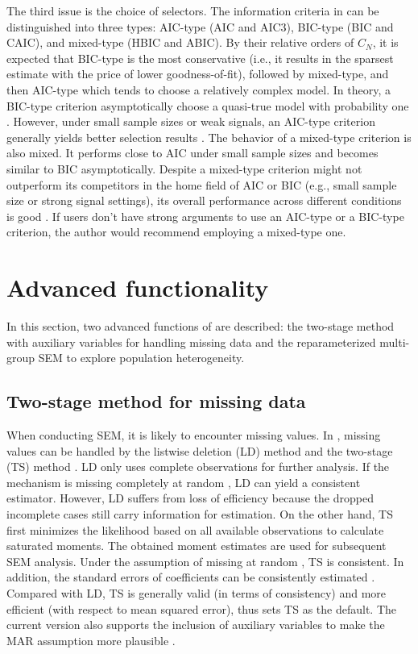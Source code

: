 \documentclass[nojss]{jss}
\begin{document}
The third issue is the choice of selectors. The information criteria in  can be distinguished into three types: AIC-type (AIC and AIC3), BIC-type (BIC and CAIC), and mixed-type (HBIC and ABIC). By their relative orders of $C_N$, it is expected that BIC-type is the most conservative (i.e., it results in the sparsest estimate with the price of lower goodness-of-fit), followed by mixed-type, and then AIC-type which tends to choose a relatively complex model. In theory, a BIC-type criterion asymptotically choose a quasi-true model with probability one \citep[e.g.,][]{Huang2017}. However, under small sample sizes or weak signals, an AIC-type criterion generally yields better selection results \citep[e.g.,][]{Vrieze2012}. The behavior of a mixed-type criterion is also mixed. It performs close to AIC under small sample sizes and becomes similar to BIC asymptotically. Despite a mixed-type criterion might not outperform its competitors in the home field of AIC or BIC (e.g., small sample size or strong signal settings), its overall performance across different conditions is good \citep[e.g.,][]{Lin2017}. If users don't have strong arguments to use an AIC-type or a BIC-type criterion, the author would recommend employing a mixed-type one.



\section{Advanced functionality} \label{sec:adv}
In this section, two advanced functions of  are described: the two-stage method with auxiliary variables for handling missing data and the reparameterized multi-group SEM to explore population heterogeneity.


\subsection{Two-stage method for missing data} \label{sec:adv_miss}
When conducting SEM, it is likely to encounter missing values. In , missing values can be handled by the listwise deletion (LD) method and the two-stage (TS) method \citep{Yuan2000}. LD only uses complete observations for further analysis. If the mechanism is missing completely at random \citep[MCAR;][]{Rubin1976}, LD can yield a consistent estimator. However, LD suffers from loss of efficiency because the dropped incomplete cases still carry information for estimation. On the other hand, TS first minimizes the likelihood based on all available observations to calculate saturated moments. The obtained moment estimates are used for subsequent SEM analysis. Under the assumption of missing at random \citep[MAR;][]{Rubin1976}, TS is consistent. In addition, the standard errors of coefficients can be consistently estimated \citep[e.g.,][]{Yuan2008}. Compared with LD, TS is generally valid (in terms of consistency) and more efficient (with respect to mean squared error), thus  sets TS as the default. The current version also supports the inclusion of auxiliary variables to make the MAR assumption more plausible \citep{Savalei2009}.
\end{document}
